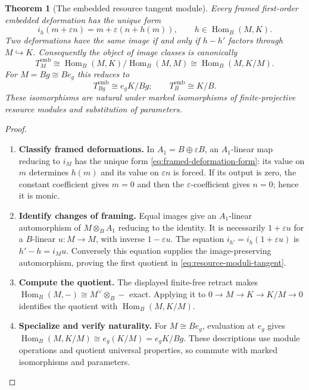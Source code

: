 \documentclass[11pt,a4paper]{article}
\numberwithin{algorithm}{section}
\numberwithin{equation}{section}
\newtheorem{theorem}{Theorem}[section]
\theoremstyle{definition}
\theoremstyle{remark}
\theoremstyle{plain}
\newcommand{\incl}{\hookrightarrow}
\newcommand{\eps}{\varepsilon}
\newcommand{\Hom}{\operatorname{Hom}}
\theoremstyle{definition}
\theoremstyle{plain}
\begin{document}
\begin{theorem}[The embedded resource tangent module]
\label{thm:embedded-deformation-tangent}
Every framed first-order embedded deformation has the unique form
\begin{equation}\label{eq:framed-deformation-form}
 i_h(m+\eps n)=m+\eps(n+h(m)),
 \qquad h\in\Hom_B(M,K).
\end{equation}
Two deformations have the same image if and only if
$h-h'$ factors through $M\incl K$.
Consequently the object of image classes is canonically
\begin{equation}\label{eq:resource-moduli-tangent}
 T_M^{\mathrm{emb}}
 \cong \Hom_B(M,K)/\Hom_B(M,M)
 \cong \Hom_B(M,K/M).
\end{equation}
For $M=Bg\cong Be_g$ this reduces to
\begin{equation}\label{eq:principal-resource-tangent}
 T_{Bg}^{\mathrm{emb}}
 \cong e_gK/Bg;
 \qquad T_B^{\mathrm{emb}}\cong K/B.
\end{equation}
These isomorphisms are natural under marked isomorphisms of
finite-projective resource modules and substitution of parameters.
\end{theorem}
\begin{proof}\leavevmode
\begin{enumerate}[leftmargin=*,align=left]
\item \textbf{Classify framed deformations.}
In $A_1=B\oplus\eps B$, an $A_1$-linear map reducing to $i_M$
has the unique form \eqref{eq:framed-deformation-form}:
its value on $m$ determines $h(m)$ and its value on $\eps n$
is forced. If its output is zero, the constant coefficient gives
$m=0$ and then the $\eps$-coefficient gives $n=0$; hence it is monic.

\item \textbf{Identify changes of framing.}
Equal images give an $A_1$-linear automorphism of
$M\otimes_BA_1$ reducing to the identity. It is necessarily
$1+\eps u$ for a $B$-linear $u:M\to M$, with inverse $1-\eps u$.
The equation $i_{h'}=i_h(1+\eps u)$ is $h'-h=i_Mu$.
Conversely this equation supplies the image-preserving
automorphism, proving the first quotient in
\eqref{eq:resource-moduli-tangent}.

\item \textbf{Compute the quotient.}
The displayed finite-free retract makes
$\Hom_B(M,-)\cong M^\vee\otimes_B-$ exact.
Applying it to $0\to M\to K\to K/M\to0$ identifies the quotient
with $\Hom_B(M,K/M)$.

\item \textbf{Specialize and verify naturality.}
For $M\cong Be_g$, evaluation at $e_g$ gives
$\Hom_B(M,K/M)\cong e_g(K/M)=e_gK/Bg$.
These descriptions use module operations and quotient universal
properties, so commute with marked isomorphisms and parameters.
\end{enumerate}
\end{proof}
\end{document}

